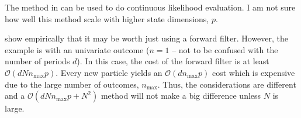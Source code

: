 \documentclass[notitlepage]{article}
\newcommand{\Lparen}[1]{\left( #1\right)}
\newcommand{\bigO}[1]{\mathcal{O}\Lparen{#1}}
\newcommand{\dimState}{p}
\newcommand{\nPart}{N}
\newcommand{\nPeriods}{d}
\newcommand{\nMax}{n_{\text{max}}}
\begin{document}
The method in \citet[see particularly section 6.2 on page 203]{malik11} can be used to do continuous likelihood evaluation. I am not sure how well this method scale with higher state dimensions, $\dimState$.

\citet{kantas15} show empirically that it may be worth just using a forward filter. However, the example is with an univariate outcome ($n=1$ -- not to be confused with the number of periods $\nPeriods$). In this case, the cost of the forward filter is at least $\bigO{\nPeriods\nPart\nMax\dimState}$. Every new particle yields an $\bigO{\nPeriods\nMax\dimState}$ cost which is expensive due to the large number of outcomes, $\nMax$. Thus, the considerations are different and a $\bigO{\nPeriods\nPart\nMax\dimState + \nPart^2}$ method will not make a big difference unless $\nPart$ is large.
\end{document}
